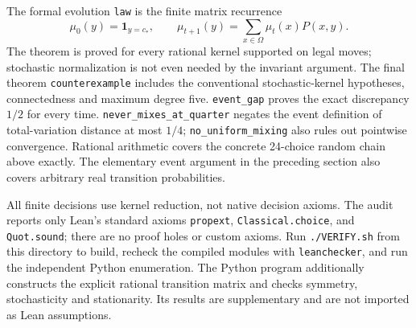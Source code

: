 \documentclass[11pt]{article}
\begin{document}
The formal evolution \texttt{law} is the finite matrix recurrence
\[
\mu_0(y)=\mathbf1_{y=c_*},\qquad
\mu_{t+1}(y)=\sum_{x\in\Omega}\mu_t(x)P(x,y).
\]
The theorem is proved for every rational kernel supported on legal moves; stochastic normalization is not even needed by the invariant argument. The final theorem \texttt{counterexample} includes the conventional stochastic-kernel hypotheses, connectedness and maximum degree five. \texttt{event\_gap} proves the exact discrepancy $1/2$ for every time. \texttt{never\_mixes\_at\_quarter} negates the event definition of total-variation distance at most $1/4$; \texttt{no\_uniform\_mixing} also rules out pointwise convergence. Rational arithmetic covers the concrete 24-choice random chain above exactly. The elementary event argument in the preceding section also covers arbitrary real transition probabilities.

All finite decisions use kernel reduction, not native decision axioms. The audit reports only Lean's standard axioms \texttt{propext}, \texttt{Classical.choice}, and \texttt{Quot.sound}; there are no proof holes or custom axioms. Run \texttt{./VERIFY.sh} from this directory to build, recheck the compiled modules with \texttt{leanchecker}, and run the independent Python enumeration. The Python program additionally constructs the explicit rational transition matrix and checks symmetry, stochasticity and stationarity. Its results are supplementary and are not imported as Lean assumptions.
\end{document}
